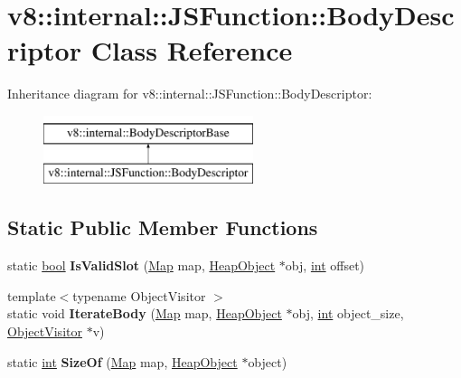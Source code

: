 \hypertarget{classv8_1_1internal_1_1JSFunction_1_1BodyDescriptor}{}\section{v8\+:\+:internal\+:\+:J\+S\+Function\+:\+:Body\+Descriptor Class Reference}
\label{classv8_1_1internal_1_1JSFunction_1_1BodyDescriptor}
Inheritance diagram for v8\+:\+:internal\+:\+:J\+S\+Function\+:\+:Body\+Descriptor\+:\begin{figure}[H]
\begin{center}
\leavevmode
\includegraphics[height=2.000000cm]{classv8_1_1internal_1_1JSFunction_1_1BodyDescriptor}
\end{center}
\end{figure}
\subsection*{Static Public Member Functions}
\begin{DoxyCompactItemize}
\item 
\mbox{\label{classv8_1_1internal_1_1JSFunction_1_1BodyDescriptor_a2f949763bffcff45e46b95a4ae8f623d}} 
static \mbox{\hyperlink{classbool}{bool}} {\bfseries Is\+Valid\+Slot} (\mbox{\hyperlink{classv8_1_1internal_1_1Map}{Map}} map, \mbox{\hyperlink{classv8_1_1internal_1_1HeapObject}{Heap\+Object}} $\ast$obj, \mbox{\hyperlink{classint}{int}} offset)
\item 
\mbox{\label{classv8_1_1internal_1_1JSFunction_1_1BodyDescriptor_a10aecf44889b1fc8d671098f28da9476}} 
{\footnotesize template$<$typename Object\+Visitor $>$ }\\static void {\bfseries Iterate\+Body} (\mbox{\hyperlink{classv8_1_1internal_1_1Map}{Map}} map, \mbox{\hyperlink{classv8_1_1internal_1_1HeapObject}{Heap\+Object}} $\ast$obj, \mbox{\hyperlink{classint}{int}} object\+\_\+size, \mbox{\hyperlink{classv8_1_1internal_1_1ObjectVisitor}{Object\+Visitor}} $\ast$v)
\item 
\mbox{\label{classv8_1_1internal_1_1JSFunction_1_1BodyDescriptor_a9b1c7c1126008f651dedeb6d74ece4f1}} 
static \mbox{\hyperlink{classint}{int}} {\bfseries Size\+Of} (\mbox{\hyperlink{classv8_1_1internal_1_1Map}{Map}} map, \mbox{\hyperlink{classv8_1_1internal_1_1HeapObject}{Heap\+Object}} $\ast$object)
\end{DoxyCompactItemize}
